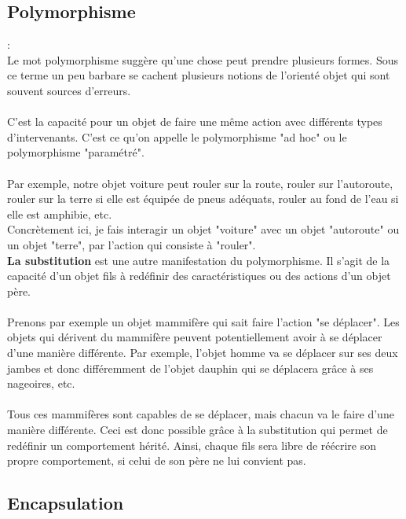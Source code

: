 \documentclass[a4paper,12pt,openany]{book}
\begin{document}
\subsection{Polymorphisme}: \\

Le mot polymorphisme suggère qu’une chose peut prendre plusieurs formes. Sous ce terme un peu barbare se cachent plusieurs notions de l’orienté objet qui sont souvent sources d’erreurs.\\
\\
C'est la capacité pour un objet de faire une même action avec différents types d’intervenants. C’est ce qu’on appelle le polymorphisme "ad hoc" ou le polymorphisme "paramétré".\\
\\
Par exemple, notre objet voiture peut rouler sur la route, rouler sur l’autoroute, rouler sur la terre si elle est équipée de pneus adéquats, rouler au fond de l’eau si elle est amphibie, etc.\\
Concrètement ici, je fais interagir un objet "voiture" avec un objet "autoroute" ou un objet "terre", par l’action qui consiste à "rouler".\\

\textbf{La substitution} est une autre manifestation du polymorphisme. Il s’agit de la capacité d’un objet fils à redéfinir des caractéristiques ou des actions d’un objet père.\\
\\
Prenons par exemple un objet mammifère qui sait faire l’action "se déplacer". Les objets qui dérivent du mammifère peuvent potentiellement avoir à se déplacer d’une manière différente. Par exemple, l’objet homme va se déplacer sur ses deux jambes et donc différemment de l’objet dauphin qui se déplacera grâce à ses nageoires, etc.\\
\\
Tous ces mammifères sont capables de se déplacer, mais chacun va le faire d’une manière différente. Ceci est donc possible grâce à la substitution qui permet de redéfinir un comportement hérité. Ainsi, chaque fils sera libre de réécrire son propre comportement, si celui de son père ne lui convient pas.\\

\subsection{Encapsulation}
\end{document}
